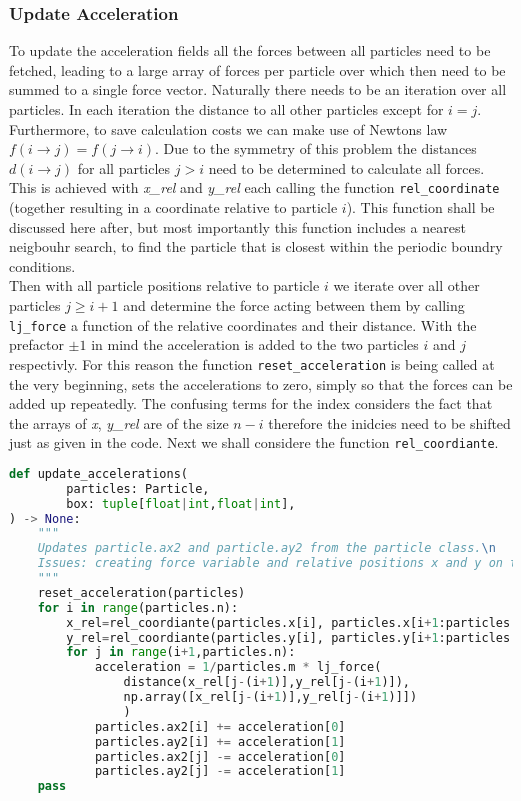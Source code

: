 \documentclass{article}
\begin{document}
\subsubsection{Update Acceleration}
To update the acceleration fields all the forces between all particles need to be fetched, leading to a large array of forces per particle over which then need to be summed to a single force vector. Naturally there needs to be an iteration over all particles. In each iteration the distance to all other particles except for $i=j$. Furthermore, to save calculation costs we can make use of Newtons law $f(i\to j)=f(j\to i)$. Due to the symmetry of this problem the distances $d(i \to j)$ for all particles $j>i$ need to be determined to calculate all forces. This is achieved with \textit{x_rel} and \textit{y_rel}  each calling the function \texttt{rel_coordinate} (together resulting in a coordinate relative to particle $i$). This function shall be discussed here after, but most importantly this function includes a nearest neigbouhr search, to find the particle that is closest within the periodic boundry conditions. \\

Then with all particle positions relative to particle $i$ we iterate over all other particles $j\geq i+1$ and determine the force acting between them by calling \texttt{lj_force} a function of the relative coordinates and their distance. With the prefactor $\pm1$ in mind the acceleration is added to the two particles $i$ and $j$ respectivly. For this reason the function \texttt{reset_acceleration} is being called at the very beginning, sets the accelerations to zero, simply so that the forces can be added up repeatedly. The confusing terms for the index considers the fact that the arrays of \textit{x}, \textit{y_rel} are of the size $n-i$ therefore the inidcies need to be shifted just as given in the code. Next we shall considere the function \texttt{rel_coordiante}.
\pagebreak
\begin{lstlisting}[language=Python, caption=updating accelerations]
def update_accelerations(
        particles: Particle,
        box: tuple[float|int,float|int],    
) -> None:
    """
    Updates particle.ax2 and particle.ay2 from the particle class.\n
    Issues: creating force variable and relative positions x and y on the fly.
    """
    reset_acceleration(particles)
    for i in range(particles.n):
        x_rel=rel_coordiante(particles.x[i], particles.x[i+1:particles.n],box[0]) 
        y_rel=rel_coordiante(particles.y[i], particles.y[i+1:particles.n],box[1])
        for j in range(i+1,particles.n):
            acceleration = 1/particles.m * lj_force(
                distance(x_rel[j-(i+1)],y_rel[j-(i+1)]),
                np.array([x_rel[j-(i+1)],y_rel[j-(i+1)]])
                )
            particles.ax2[i] += acceleration[0]  
            particles.ay2[i] += acceleration[1]
            particles.ax2[j] -= acceleration[0] 
            particles.ay2[j] -= acceleration[1]
    pass
\end{lstlisting}
\pagebreak
\end{document}

